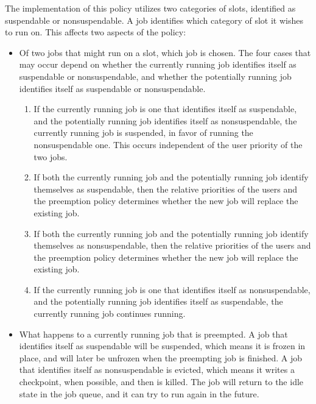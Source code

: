 The implementation of this policy utilizes two categories of slots,
identified as suspendable or nonsuspendable.
A job identifies which category of slot it wishes to run on.
This affects two aspects of the policy:
\begin{itemize}
\item{Of two jobs that might run on a slot, which job is chosen.} 
The four cases that may occur depend on
whether the currently running job identifies itself as 
suspendable or nonsuspendable, and whether the potentially running job
identifies itself as suspendable or nonsuspendable.
  \begin{enumerate}
  \item If the currently running job is one that identifies 
  itself as suspendable,
  and the potentially running job identifies itself as nonsuspendable,
  the currently running job is suspended, in favor of running the
  nonsuspendable one.  This occurs independent of the user priority of
  the two jobs.
  \item If both the currently running job and the potentially running job 
  identify themselves as suspendable,
  then the relative priorities of the users and the preemption policy 
  determines whether the new job will replace the existing job.
  \item If both the currently running job and the potentially running job 
  identify themselves as nonsuspendable,
  then the relative priorities of the users and the preemption policy 
  determines whether the new job will replace the existing job.
  \item If the currently running job is one that identifies 
  itself as nonsuspendable,
  and the potentially running job identifies itself as suspendable,
  the currently running job continues running.
  \end{enumerate}
\item{What happens to a currently running job that is preempted.}
A job that identifies itself as suspendable will be suspended,
which means it is frozen in place,
and will later be unfrozen when the preempting job is finished.
A job that identifies itself as nonsuspendable is evicted,
which means it writes a checkpoint, when possible,
and then is killed.
The job will return to the idle state in the job queue,
and it can try to run again in the future.
\end{itemize}


